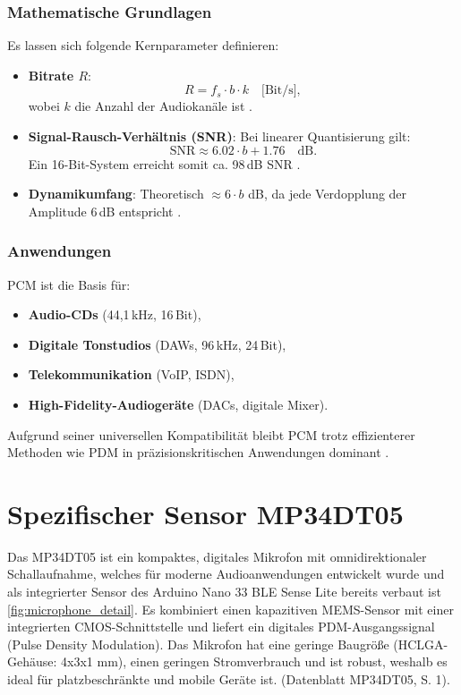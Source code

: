 \subsubsection{Mathematische Grundlagen}
Es lassen sich folgende Kernparameter definieren:
\begin{itemize}
	\item \textbf{Bitrate \( R \)}:
	\begin{equation}
		R = f_s \cdot b \cdot k \quad \text{[Bit/s]},
	\end{equation}
	wobei \( k \) die Anzahl der Audiokanäle ist \cite{Weinzierl:2008}.
	
	\item \textbf{Signal-Rausch-Verhältnis (SNR)}: Bei linearer Quantisierung gilt:
	\begin{equation}
		\text{SNR} \approx 6.02 \cdot b + 1.76 \quad \text{dB}.
	\end{equation}
	Ein 16-Bit-System erreicht somit ca. 98\,dB SNR \cite{Weinzierl:2008}.
	
	\item \textbf{Dynamikumfang}: Theoretisch \( \approx 6 \cdot b \) dB, da jede Verdopplung der Amplitude 6\,dB entspricht \cite{Weinzierl:2008}.
\end{itemize}

\subsubsection{Anwendungen}
PCM ist die Basis für:
\begin{itemize}
	\item \textbf{Audio-CDs} (44,1\,kHz, 16\,Bit),
	\item \textbf{Digitale Tonstudios} (DAWs, 96\,kHz, 24\,Bit),
	\item \textbf{Telekommunikation} (VoIP, ISDN),
	\item \textbf{High-Fidelity-Audiogeräte} (DACs, digitale Mixer).
\end{itemize}
Aufgrund seiner universellen Kompatibilität bleibt PCM trotz effizienterer Methoden wie PDM in präzisionskritischen Anwendungen dominant \cite{Weinzierl:2008}.

\bigskip

\section{Spezifischer Sensor MP34DT05}
Das MP34DT05 ist ein kompaktes, digitales Mikrofon mit omnidirektionaler Schallaufnahme, welches für moderne Audioanwendungen entwickelt wurde und als integrierter Sensor des Arduino Nano 33 BLE Sense Lite bereits verbaut ist \ref{fig:microphone_detail}. Es kombiniert einen kapazitiven MEMS-Sensor mit einer integrierten CMOS-Schnittstelle und liefert ein digitales PDM-Ausgangssignal (Pulse Density Modulation). Das Mikrofon hat eine geringe Baugröße (HCLGA-Gehäuse: 4x3x1 mm), einen geringen Stromverbrauch und ist robust, weshalb es ideal für platzbeschränkte und mobile Geräte ist. (Datenblatt MP34DT05, S. 1).

